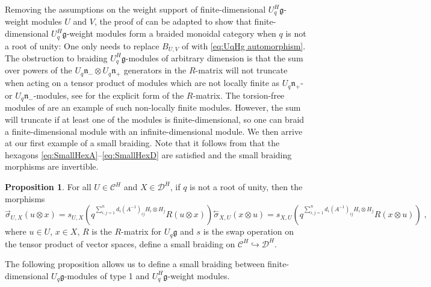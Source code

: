 \documentclass[12pt,dvipsnames]{article}
\numberwithin{equation}{section}
\theoremstyle{definition}
\newtheorem{proposition}[definition]{Proposition}
\newcommand{\cat}[1]{\mathcal{#1}}
\newcommand{\1}{\ensuremath{\mathbbm{1}}}
\newcommand{\lc}{\ensuremath{\overset{\rightarrow}{\sigma}}}
\newcommand{\rc}{\ensuremath{\overset{\leftarrow}{\sigma}}}
\begin{document}
Removing the assumptions on the weight support of finite-dimensional $U_q^H\mathfrak{g}$-weight modules $U$ and $V$, the proof of \cite[Prop.\,8.19]{KS97} can be adapted to show that finite-dimensional $U_q^H\mathfrak{g}$-weight modules form a braided monoidal category when $q$ is not a root of unity: One only needs to replace $B_{U,V}$ of \cite[Prop.\,8.19]{KS97} with \eqref{eq:UqHg automorphism}. The obstruction to braiding $U_q^H\mathfrak{g}$-modules of arbitrary dimension is that the sum over powers of the $U_q\mathfrak{n}_-\otimes U_q\mathfrak{n}_+$ generators in the $R$-matrix will not truncate when acting on a tensor product of modules which are not locally finite as $U_q\mathfrak{n}_+$-  or $U_q\mathfrak{n}_-$-modules, see \cite[Thm.\,8.18]{KS97} for the explicit form of the $R$-matrix. The torsion-free modules of \cite{FHW14} are an example of such non-locally finite modules. However, the sum will truncate if at least one of the modules is finite-dimensional, so one can braid a finite-dimensional module with an infinite-dimensional module. We then arrive at our first example of a small braiding. Note that it follows from \cite[Thm.\,8.18]{KS97} that the hexagons \eqref{eq:SmallHexA}--\eqref{eq:SmallHexD} are satisfied and the small braiding morphisms are invertible.
\begin{proposition}\label{prop:Unrolled small braiding}
    For all $U\in\cat{C}^H$ and $X\in\cat{D}^H$, if $q$ is not a root of unity, then the morphisms
    \begin{subequations}
        \begin{equation}
            \lc_{U,X}(u\otimes x) = s_{U,X}\left(q^{\sum_{i,j=1}^nd_i(A^{-1})_{ij}H_i\otimes H_j}R(u\otimes x) \right)
        \end{equation}
        \begin{equation}
            \rc_{X,U}(x\otimes u) = s_{X,U}\left(q^{\sum_{i,j=1}^nd_i(A^{-1})_{ij}H_i\otimes H_j}R(x\otimes u)\right) \;,
        \end{equation}
    \end{subequations}
    where $u\in U$, $x\in X$, $R$ is the $R$-matrix for $U_q\mathfrak{g}$ and $s$ is the swap operation on the tensor product of vector spaces, define a small braiding on $\cat{C}^H\hookrightarrow\cat{D}^H$.
\end{proposition}

The following proposition allows us to define a small braiding between finite-dimensional $U_q\mathfrak{g}$-modules of type 1 and $U_q^H\mathfrak{g}$-weight modules.
\end{document}
